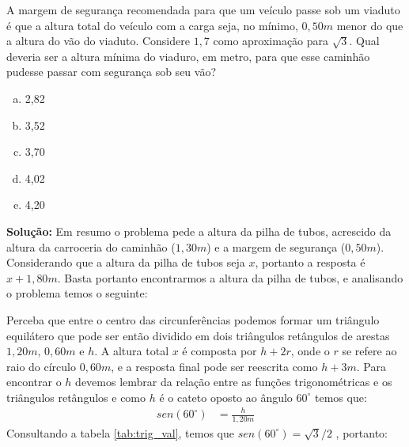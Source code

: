 \begin{multicols*}{2}
    A margem de segurança recomendada para que um veículo passe sob um viaduto é que
    a altura total do veículo com a carga seja, no mínimo, $0,50m$ menor do que a altura
    do vão do viaduto.
    Considere $1,7$ como aproximação para $\sqrt{3}$.
    Qual deveria ser a altura mínima do viaduro, em metro, para que esse caminhão 
    pudesse passar com segurança sob seu vão?
    \begin{enumerate}[a)]
        \item 2,82
        \item 3,52
        \item 3,70
        \item 4,02
        \item 4,20
    \end{enumerate}

    \textbf{Solução:} Em resumo o problema pede a altura da pilha de tubos, 
    acrescido da altura da carroceria do caminhão ($1,30m$) e a margem de segurança ($0,50m$).
    Considerando que a altura da pilha de tubos seja $x$, portanto a resposta é 
    $x+1,80m$. Basta portanto encontrarmos a altura da pilha de tubos, e analisando 
    o problema temos o seguinte: 
    
    \begin{figure}[H]
        \centering
    \end{figure}

    Perceba que entre o centro das circunferências podemos formar um triângulo 
    equilátero que pode ser então dividido em dois triângulos retângulos de arestas 
    $1,20m$, $0,60m$ e $h$. A altura total $x$ é composta por $h + 2r$, onde 
    o $r$ se refere ao raio do círculo $0,60m$, e a resposta final 
    pode ser reescrita como $h+3m$. Para encontrar o $h$ devemos 
    lembrar da relação entre as funções trigonométricas e os triângulos retângulos
    e como $h$ é o cateto oposto ao ângulo $60^\circ$ temos que:
    \begin{align}
        sen(60^\circ) &= \frac{h}{1,20m}
    \end{align}
    Consultando a tabela \ref{tab:trig_val}, temos que $sen(60^\circ) = \sqrt{3}/2$
    , portanto:  
    

\end{multicols*}
